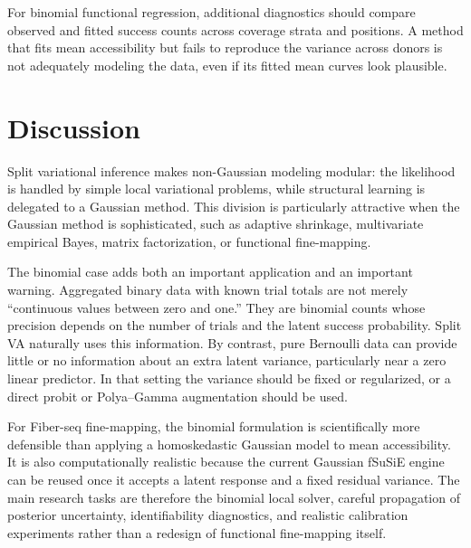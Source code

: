 \documentclass[11pt]{article}
\begin{document}
For binomial functional regression, additional diagnostics should compare
observed and fitted success counts across coverage strata and positions. A
method that fits mean accessibility but fails to reproduce the variance across
donors is not adequately modeling the data, even if its fitted mean curves
look plausible.

\section{Discussion}

Split variational inference makes non-Gaussian modeling modular: the
likelihood is handled by simple local variational problems, while structural
learning is delegated to a Gaussian method. This division is particularly
attractive when the Gaussian method is sophisticated, such as adaptive
shrinkage, multivariate empirical Bayes, matrix factorization, or functional
fine-mapping.

The binomial case adds both an important application and an important warning.
Aggregated binary data with known trial totals are not merely ``continuous
values between zero and one.'' They are binomial counts whose precision
depends on the number of trials and the latent success probability. Split VA
naturally uses this information. By contrast, pure Bernoulli data can provide
little or no information about an extra latent variance, particularly near a
zero linear predictor. In that setting the variance should be fixed or
regularized, or a direct probit or Polya--Gamma augmentation should be used.

For Fiber-seq fine-mapping, the binomial formulation is scientifically more
defensible than applying a homoskedastic Gaussian model to mean accessibility.
It is also computationally realistic because the current Gaussian fSuSiE
engine can be reused once it accepts a latent response and a fixed residual
variance. The main research tasks are therefore the binomial local solver,
careful propagation of posterior uncertainty, identifiability diagnostics,
and realistic calibration experiments rather than a redesign of functional
fine-mapping itself.
\end{document}
